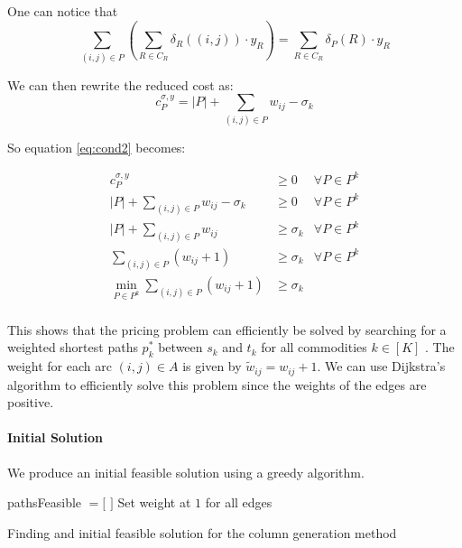 \documentclass[14pt,a4paper]{article}
\theoremstyle{definition}
\numberwithin{equation}{subsection}
\begin{document}
One can notice that 
$$ \sum_{(i,j)\in P}\left(\sum_{R \in C_R} \delta_R((i,j))\cdot y_R \right)=   \sum\limits_{R \in C_R}    \delta_P(R)\cdot y_R$$



We can then rewrite the reduced cost as: 
$$ c_P^{\sigma,y} = |P| + \sum\limits_{(i,j) \in P}  w_{ij} -\sigma_k $$

So equation \eqref{eq:cond2} becomes:

\begin{eqnarray*}
		c_P^{\sigma,y} & \geq 0 &\forall P \in P^k\\
		|P| + \sum\limits_{(i,j) \in P}  w_{ij} -\sigma_k & \geq 0 &\forall P \in P^k\\
		|P| + \sum\limits_{(i,j) \in P}  w_{ij}  & \geq \sigma_k &\forall P \in P^k\\
		\sum\limits_{(i,j) \in P} \left( w_{ij} + 1\right)  & \geq \sigma_k &\forall P \in P^k\\
		\min_{P\in P^k}\sum\limits_{(i,j) \in P} \left( w_{ij} + 1\right)  & \geq \sigma_k & \\
\end{eqnarray*}



This shows that the pricing problem can efficiently be solved by searching for a weighted shortest paths $p^*_k$ between $s_k$ and $t_k$ for all commodities $k \in [K]$ . The weight for each arc $(i,j)\in A$ is given by $\tilde{w}_{ij} = w_{ij}+1$. We can use Dijkstra's algorithm to efficiently solve this problem since the weights of the edges are positive.





\paragraph{Initial Solution}
We produce an initial feasible solution using a greedy algorithm.\\


\begin{algorithm}[H]
	\SetAlgoLined
	pathsFeasible $= [$  $]$\;
	Set weight at $1$ for all edges\;
	
	
	\caption{Finding and initial feasible solution for the column generation method}
\end{algorithm}
\end{document}
